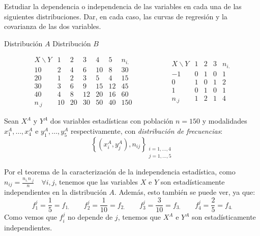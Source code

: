 \begin{ejercicio}
    Estudiar la dependencia o independencia de las variables en cada una de las siguientes distribuciones. Dar, en cada caso, las curvas de regresión y la covarianza de las dos variables.
    \begin{center}
        \hspace{1.3cm}
        Distribución $A$ \hspace{2cm}
        Distribución $B$
    \end{center}
    \begin{equation*}
        \begin{array}{c|ccccc|c}
            X\backslash Y & 1 & 2& 3& 4& 5 &n_{i.}\\ \hline
            10 & 2 & 4 & 6 & 10 & 8 & 30\\
            20 & 1 & 2 & 3 & 5 & 4 & 15\\
            30 & 3 & 6 & 9 & 15 & 12 & 45\\
            40 & 4 & 8 & 12 & 20 & 16 & 60 \\ \hline
            n_{.j} & 10 & 20 & 30 & 50 & 40 & 150
        \end{array}
        \hspace{2cm}
        \begin{array}{c|ccc|c}
            X\backslash Y & 1 & 2 & 3 & n_{i.}\\ \hline
            -1 & 0 & 1 & 0 & 1\\
            0 & 1 & 0 & 1 & 2\\
            1 & 0 & 1 & 0 & 1 \\ \hline
            n_{.j} & 1 & 2 & 1 & 4
        \end{array}
    \end{equation*}

    Sean $X^A$ y $Y^A$ dos variables estadísticas con población $n=150$ y modalidades $x_1^A, \dots, x_4^A$ e $y_1^A, \dots, y_5^A$ respectivamente, con \emph{distribución de frecuencias}:
        $$\left\{ (x_i^A,y_j^A), n_{ij}\right\}_{\substack{i=1,\dots,4\\j=1,\dots,5}}$$

    Por el teorema de la caracterización de la independencia estadística, como $n_{ij}=\frac{n_{i.}n_{.j}}{n} \quad \forall i,j$, tenemos que las variables $X$ e $Y$ son estadísticamente independientes en la distribución $A$. Además, esto también se puede ver, ya que:
    \begin{equation*}
        f_1^j = \frac{1}{5}=f_{1.}
        \qquad
        f_2^j = \frac{1}{10}=f_{2.}
        \qquad
        f_3^j = \frac{3}{10}=f_{3.}
        \qquad
        f_4^j = \frac{2}{5}=f_{4.}
    \end{equation*}
    Como vemos que $f_i^j$ no depende de $j$, tenemos que $X^A$ e $Y^A$ son estadísticamente independientes.


\end{ejercicio}
